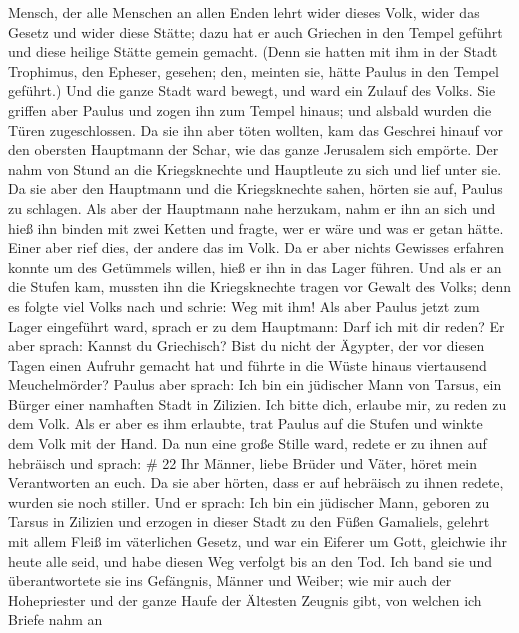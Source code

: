 Mensch, der alle Menschen an allen Enden lehrt wider dieses Volk, wider
das Gesetz und wider diese Stätte; dazu hat er auch Griechen in den
Tempel geführt und diese heilige Stätte gemein gemacht. 
(Denn sie hatten mit ihm in der Stadt Trophimus, den Epheser, gesehen;
den, meinten sie, hätte Paulus in den Tempel geführt.)  Und
die ganze Stadt ward bewegt, und ward ein Zulauf des Volks. Sie griffen
aber Paulus und zogen ihn zum Tempel hinaus; und alsbald wurden die
Türen zugeschlossen.  Da sie ihn aber töten wollten, kam
das Geschrei hinauf vor den obersten Hauptmann der Schar, wie das ganze
Jerusalem sich empörte.  Der nahm von Stund an die
Kriegsknechte und Hauptleute zu sich und lief unter sie. Da sie aber den
Hauptmann und die Kriegsknechte sahen, hörten sie auf, Paulus zu
schlagen.  Als aber der Hauptmann nahe herzukam, nahm er
ihn an sich und hieß ihn binden mit zwei Ketten und fragte, wer er wäre
und was er getan hätte.  Einer aber rief dies, der andere
das im Volk. Da er aber nichts Gewisses erfahren konnte um des Getümmels
willen, hieß er ihn in das Lager führen.  Und als er an die
Stufen kam, mussten ihn die Kriegsknechte tragen vor Gewalt des Volks;
 denn es folgte viel Volks nach und schrie: Weg mit ihm!
 Als aber Paulus jetzt zum Lager eingeführt ward, sprach er
zu dem Hauptmann: Darf ich mit dir reden? Er aber sprach: Kannst du
Griechisch?  Bist du nicht der Ägypter, der vor diesen
Tagen einen Aufruhr gemacht hat und führte in die Wüste hinaus
viertausend Meuchelmörder?  Paulus aber sprach: Ich bin ein
jüdischer Mann von Tarsus, ein Bürger einer namhaften Stadt in Zilizien.
Ich bitte dich, erlaube mir, zu reden zu dem Volk.  Als er
aber es ihm erlaubte, trat Paulus auf die Stufen und winkte dem Volk mit
der Hand. Da nun eine große Stille ward, redete er zu ihnen auf
hebräisch und sprach: \# 22  Ihr Männer, liebe Brüder und
Väter, höret mein Verantworten an euch.  Da sie aber hörten,
dass er auf hebräisch zu ihnen redete, wurden sie noch stiller. Und er
sprach:  Ich bin ein jüdischer Mann, geboren zu Tarsus in
Zilizien und erzogen in dieser Stadt zu den Füßen Gamaliels, gelehrt mit
allem Fleiß im väterlichen Gesetz, und war ein Eiferer um Gott,
gleichwie ihr heute alle seid,  und habe diesen Weg verfolgt
bis an den Tod. Ich band sie und überantwortete sie ins Gefängnis,
Männer und Weiber;  wie mir auch der Hohepriester und der
ganze Haufe der Ältesten Zeugnis gibt, von welchen ich Briefe nahm an
